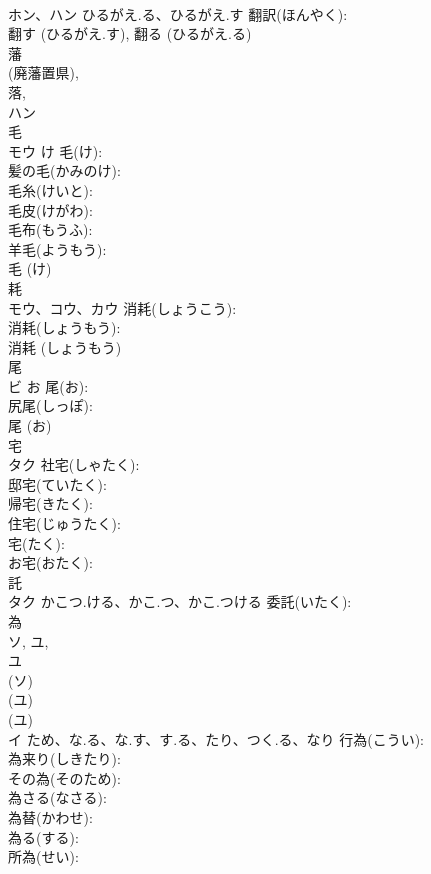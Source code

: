 \documentclass[8pt]{extreport}
\begin{document}
\begin{CJK}{UTF8}{min}
\\	ホン、ハン	ひるがえ.る、ひるがえ.す	翻訳(ほんやく): 
\\	翻す (ひるがえ.す), 翻る (ひるがえ.る)
\\	藩			
\\	(廃藩置県), 
\\	落, 
\\	ハン			
\\	毛			
\\	モウ	け	毛(け): 
\\	髪の毛(かみのけ): 
\\	毛糸(けいと): 
\\	毛皮(けがわ): 
\\	毛布(もうふ): 
\\	羊毛(ようもう): 
\\	毛 (け)
\\	耗			
\\	モウ、コウ、カウ		消耗(しょうこう): 
\\	消耗(しょうもう): 
\\	消耗 (しょうもう)
\\	尾			
\\	ビ	お	尾(お): 
\\	尻尾(しっぽ): 
\\	尾 (お)
\\	宅			
\\	タク		社宅(しゃたく): 
\\	邸宅(ていたく): 
\\	帰宅(きたく): 
\\	住宅(じゅうたく): 
\\	宅(たく): 
\\	お宅(おたく): 
\\	託			
\\	タク	かこつ.ける、かこ.つ、かこ.つける	委託(いたく): 
\\	為			
\\	ソ, ユ, 
\\	ユ 
\\	(ソ) 
\\	(ユ) 
\\	(ユ) 
\\	イ	ため、な.る、な.す、す.る、たり、つく.る、なり	行為(こうい): 
\\	為来り(しきたり): 
\\	その為(そのため): 
\\	為さる(なさる): 
\\	為替(かわせ): 
\\	為る(する): 
\\	所為(せい): 

\end{CJK}
\end{document}
